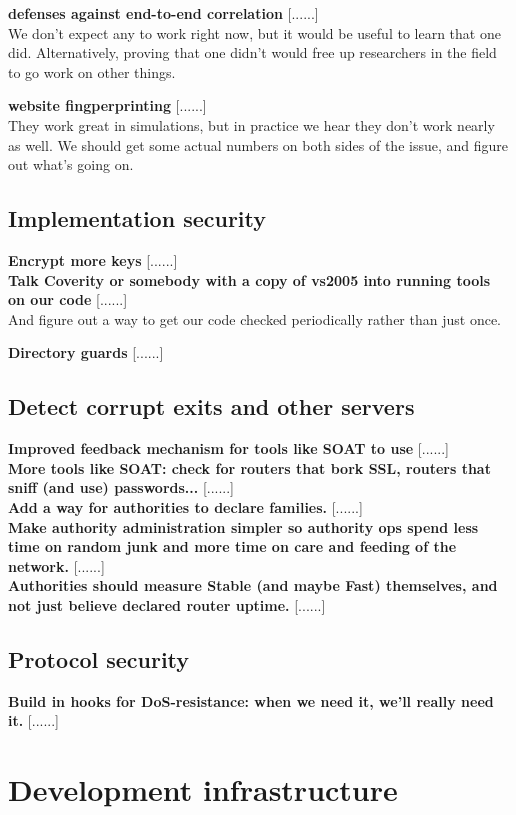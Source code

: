 \documentclass{article}
\newcommand{\tmp}[1]{{\bf #1} [......] \\}
\begin{document}
\tmp{defenses against end-to-end correlation}  We don't expect any to work
right now, but it would be useful to learn that one did.  Alternatively,
proving that one didn't would free up researchers in the field to go work on
other things.

\tmp{website fingperprinting}  They work great in simulations, but in
practice we hear they don't work nearly as well. We should get some actual
numbers on both sides of the issue, and figure out what's going on.

\subsection{Implementation security}

\tmp{Encrypt more keys}

\tmp{Talk Coverity or somebody with a copy of vs2005 into running tools on
  our code} And figure out a way to get our code checked periodically rather
  than just once.

\tmp{Directory guards}

\subsection{Detect corrupt exits and other servers}

\tmp{Improved feedback mechanism for tools like SOAT to use}

\tmp{More tools like SOAT: check for routers that bork SSL, routers that
  sniff (and use) passwords...}

\tmp{Add a way for authorities to declare families.}

\tmp{Make authority administration simpler so authority ops spend less time
  on random junk and more time on care and feeding of the network.}

\tmp{Authorities should measure Stable (and maybe Fast) themselves, and not
  just believe declared router uptime.}

\subsection{Protocol security}

\tmp{Build in hooks for DoS-resistance: when we need it, we'll really need
  it.}


\section{Development infrastructure}
\end{document}
